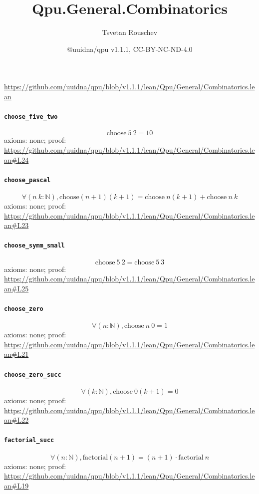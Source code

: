 \documentclass[11pt]{article}
\title{Qpu.General.Combinatorics}
\author{Tsvetan Rouschev}
\date{@uuidna/qpu v1.1.1, CC-BY-NC-ND-4.0}
\begin{document}
\maketitle
\noindent\url{https://github.com/uuidna/qpu/blob/v1.1.1/lean/Qpu/General/Combinatorics.lean}

\paragraph{\texttt{choose\_five\_two}}
\[ \mathrm{choose}\ 5\ 2 = 10 \]
\noindent axioms: none; proof: \url{https://github.com/uuidna/qpu/blob/v1.1.1/lean/Qpu/General/Combinatorics.lean\#L24}

\paragraph{\texttt{choose\_pascal}}
\[ \forall (n\ k : \mathbb{N}), \mathrm{choose} (n + 1) (k + 1) = \mathrm{choose}\ n (k + 1) + \mathrm{choose}\ n\ k \]
\noindent axioms: none; proof: \url{https://github.com/uuidna/qpu/blob/v1.1.1/lean/Qpu/General/Combinatorics.lean\#L23}

\paragraph{\texttt{choose\_symm\_small}}
\[ \mathrm{choose}\ 5\ 2 = \mathrm{choose}\ 5\ 3 \]
\noindent axioms: none; proof: \url{https://github.com/uuidna/qpu/blob/v1.1.1/lean/Qpu/General/Combinatorics.lean\#L25}

\paragraph{\texttt{choose\_zero}}
\[ \forall (n : \mathbb{N}), \mathrm{choose}\ n\ 0 = 1 \]
\noindent axioms: none; proof: \url{https://github.com/uuidna/qpu/blob/v1.1.1/lean/Qpu/General/Combinatorics.lean\#L21}

\paragraph{\texttt{choose\_zero\_succ}}
\[ \forall (k : \mathbb{N}), \mathrm{choose}\ 0 (k + 1) = 0 \]
\noindent axioms: none; proof: \url{https://github.com/uuidna/qpu/blob/v1.1.1/lean/Qpu/General/Combinatorics.lean\#L22}

\paragraph{\texttt{factorial\_succ}}
\[ \forall (n : \mathbb{N}), \mathrm{factorial} (n + 1) = (n + 1) \cdot \mathrm{factorial}\ n \]
\noindent axioms: none; proof: \url{https://github.com/uuidna/qpu/blob/v1.1.1/lean/Qpu/General/Combinatorics.lean\#L19}
\end{document}
